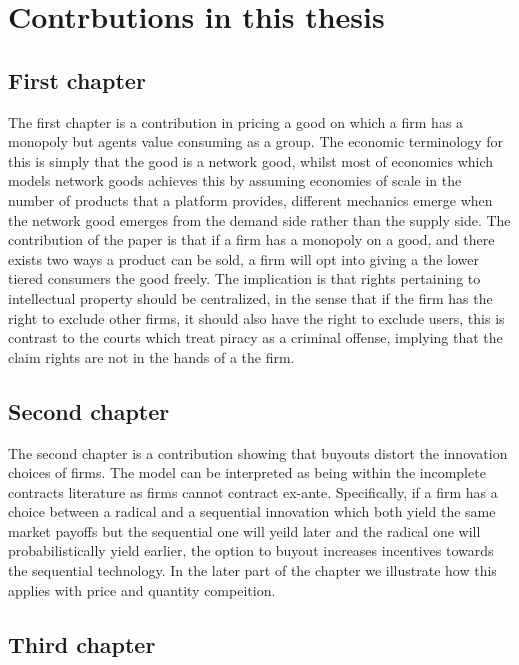 \documentclass[12pt]{article}
\numberwithin{equation}{section}
\begin{document}

\section{Contrbutions in this thesis}

\subsection{First chapter}

The first chapter is a contribution in pricing a good on which a firm has a monopoly but agents value consuming as a group. The economic terminology for this is simply that the good is a network good, whilst most of economics which models network goods achieves this by assuming economies of scale in the number of products that a platform provides, different mechanics emerge when the network good emerges from the demand side rather than the supply side. The contribution of the paper is that if a firm has a monopoly on a good, and there exists two ways a product can be sold, a firm will opt into giving a the lower tiered consumers the good freely. The implication is that rights pertaining to intellectual property should be centralized, in the sense that if the firm has the right to exclude other firms, it should also have the right to exclude users, this is contrast to the courts which treat piracy as a criminal offense, implying that the claim rights are not in the hands of a the firm.


\subsection{Second chapter}

The second chapter is a contribution showing that buyouts distort the innovation choices of firms. The model can be interpreted as being within the incomplete contracts literature as firms cannot contract ex-ante. Specifically, if a firm has a choice between a radical and a sequential innovation which both yield the same market payoffs but the sequential one will yeild later and the radical one will probabilistically yield earlier, the option to buyout increases incentives towards the sequential technology. In the later part of the chapter we illustrate how this applies with price and quantity compeition.

 \subsection{Third chapter}
\end{document}
